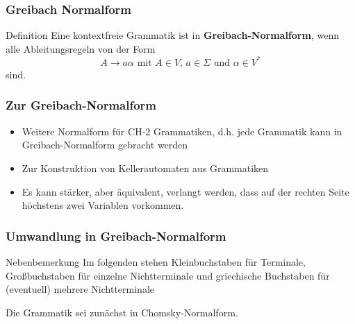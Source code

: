 \begin{frame}
\frametitle{Greibach Normalform}
\begin{exampleblock}{Definition}
Eine kontextfreie Grammatik ist in \textbf{Greibach-Normalform}, wenn alle Ableitungsregeln von der Form 
$$ A \rightarrow a\alpha \text{ mit } A \in V\text{, } a\in \Sigma \text{ und } \alpha \in V^*$$
sind.
\end{exampleblock}
\end{frame}

\begin{frame}
\frametitle{Zur Greibach-Normalform}
\begin{itemize}
\item Weitere Normalform für CH-2 Grammatiken, d.h. jede Grammatik kann in Greibach-Normalform gebracht werden
\item Zur Konstruktion von Kellerautomaten aus Grammatiken
\item Es kann stärker, aber äquivalent, verlangt werden, dass auf der rechten Seite höchstens zwei Variablen vorkommen.
\end{itemize}
\end{frame}

\begin{frame}
\frametitle{Umwandlung in Greibach-Normalform}
\begin{exampleblock}{Nebenbemerkung}
Im folgenden stehen Kleinbuchstaben für Terminale, Großbuchstaben für einzelne Nichtterminale und griechische Buchstaben für (eventuell) mehrere Nichtterminale 
\end{exampleblock}
Die Grammatik sei zunächst in Chomsky-Normalform.
\end{frame}

